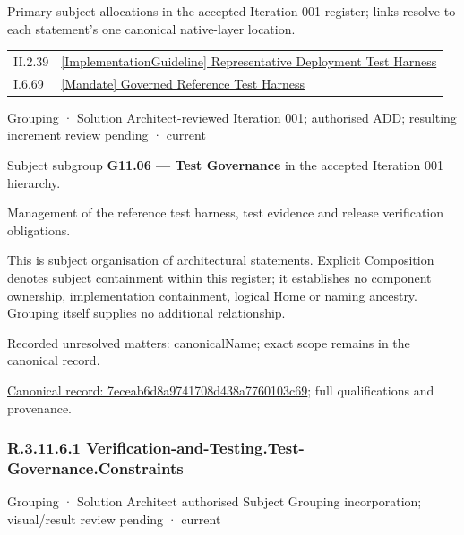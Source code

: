 Primary subject allocations in the accepted Iteration 001 register; links resolve to each statement’s one canonical native-layer location.\par
\begin{longtable}{p{.22\linewidth}p{.73\linewidth}}
II.2.39 & \hyperref[element:13ce74b78d624dd09c4401fafc911f67]{[ImplementationGuideline] Representative Deployment Test Harness} \\
I.6.69 & \hyperref[element:5ce1ef8baaf84848979ff6c9ccf6ca91]{[Mandate] Governed Reference Test Harness} \\
\end{longtable}
\label{element:7eceab6d8a9741708d438a7760103c69}
{\small Grouping · Solution Architect-reviewed Iteration 001; authorised ADD; resulting increment review pending · current}\par

Subject subgroup \textbf{G11.06 — Test Governance} in the accepted Iteration 001 hierarchy.



Management of the reference test harness, test evidence and release verification obligations.



This is subject organisation of architectural statements. Explicit Composition denotes subject containment within this register; it establishes no component ownership, implementation containment, logical Home or naming ancestry. Grouping itself supplies no additional relationship.


{\small Recorded unresolved matters: canonicalName; exact scope remains in the canonical record.}\par
{\footnotesize \href{../../../../continuum/grouping/7eceab6d8a9741708d438a7760103c69.md}{Canonical record: 7eceab6d8a9741708d438a7760103c69}; full qualifications and provenance.}\par
\subsubsection*{R.3.11.6.1 Verification-and-Testing.Test-Governance.Constraints}
\label{navigation:R.3.11.6.1}

\label{element:c5f38ca4adc24f03a2b885938186e509}
{\small Grouping · Solution Architect authorised Subject Grouping incorporation; visual/result review pending · current}\par

